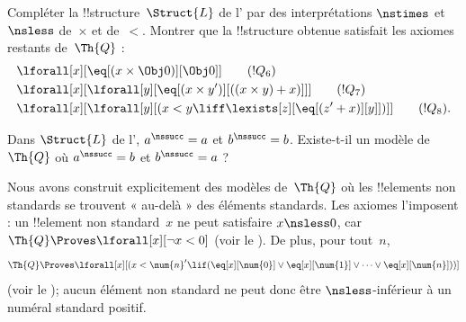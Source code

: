 \documentclass[../../../include/open-logic-section]{subfiles}
\begin{document}
\begin{prob}
Compléter la !!{structure}~$\Struct{L}$ de
l'
par des interprétations $\nstimes$ et
$\nsless$ de~$\times$ et de~$<$.
Montrer que la !!{structure} obtenue
satisfait les axiomes restants de~$\Th{Q}$ :
\begin{align*}
& \lforall[x][\eq[(x\times\Obj 0)][\Obj 0]]
  \tag{$!Q_6$}\\
& \lforall[x][\lforall[y][
  \eq[(x\times y')][((x\times y)+x)]]]
  \tag{$!Q_7$}\\
& \lforall[x][\lforall[y][
  (x<y\liff\lexists[z][\eq[(z'+x)][y]])]]
  \tag{$!Q_8$}.
\end{align*}
\end{prob}

\begin{prob}
Dans $\Struct{L}$ de
l',
$a^\nssucc=a$ et $b^\nssucc=b$.
Existe-t-il un modèle de~$\Th{Q}$
où $a^\nssucc=b$ et
$b^\nssucc=a$ ?
\end{prob}

\begin{explain}
Nous avons construit explicitement des
modèles de~$\Th{Q}$ où les !!{element}s
non standards se trouvent « au-delà »
des éléments standards. Les axiomes
l'imposent : un !!{element} non standard~$x$
ne peut satisfaire $x\nsless 0$,
car $\Th{Q}\Proves
\lforall[x][\lnot x<0]$
(voir le ).
De plus, pour tout~$n$,
\[
\Th{Q}\Proves
\lforall[x][(x<\num{n}'\lif
(\eq[x][\num{0}]\lor\eq[x][\num{1}]
\lor\dots\lor\eq[x][\num{n}]))]
\]
(voir le );
aucun élément non standard ne peut donc
être $\nsless$-inférieur à un numéral
standard positif.
\end{explain}
\end{document}
